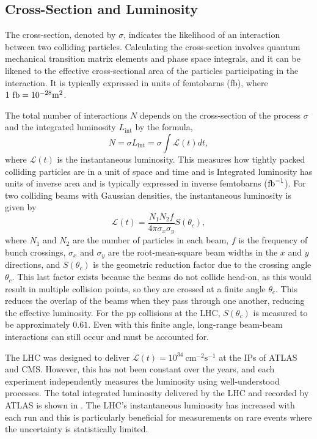 \subsection{Cross-Section and Luminosity}

The cross-section, denoted by $\sigma$, indicates the likelihood of an interaction between two colliding particles.
Calculating the cross-section involves quantum mechanical transition matrix elements and phase space integrals, and it can be likened to the effective cross-sectional area of the particles participating in the interaction.
It is typically expressed in units of femtobarns (fb), where $1~\fb = 10^{-28}\unit{\meter^2}$.

The total number of interactions $N$ depends on the cross-section of the process $\sigma$ and the integrated luminosity $L_{\text{int}}$ by the formula,
\begin{equation}
    N = \sigma L_{\text{int}} = \sigma \int \mathcal{L}(t) dt,
\end{equation}
where $\mathcal{L}(t)$ is the instantaneous luminosity.
This measures how tightly packed colliding particles are in a unit of space and time and is
Integrated luminosity has units of inverse area and is typically expressed in inverse femtobarns ($\ifb$).
For two colliding beams with Gaussian densities, the instantaneous luminosity is given by
\begin{equation}
    \mathcal{L}(t) = \frac{N_1 N_2 f}{4 \pi \sigma_x \sigma_y} S(\theta_c),
\end{equation}
where $N_1$ and $N_2$ are the number of particles in each beam, $f$ is the frequency of bunch crossings, $\sigma_x$ and $\sigma_y$ are the root-mean-square beam widths in the $x$ and $y$ directions, and $S(\theta_c)$ is the geometric reduction factor due to the crossing angle $\theta_c$.
This last factor exists because the beams do not collide head-on, as this would result in multiple collision points, so they are crossed at a finite angle $\theta_c$.
This reduces the overlap of the beams when they pass through one another, reducing the effective luminosity.
For the \Gls{pp} collisions at the \Gls{LHC}, $S(\theta_c)$ is measured to be approximately $0.61$.
Even with this finite angle, long-range beam-beam interactions can still occur and must be accounted for.

The \Gls{LHC} was designed to deliver $\mathcal{L}(t) = 10^{34}~\unit{\centi\meter^{-2}\second^{-1}}$ at the \Gls{IPs} of ATLAS and CMS.
However, this has not been constant over the years, and each experiment independently measures the luminosity using well-understood processes.
The total integrated luminosity delivered by the \Gls{LHC} and recorded by ATLAS is shown in .
The \Gls{LHC}'s instantaneous luminosity has increased with each run and this is particularly beneficial for measurements on rare events where the uncertainty is statistically limited.

